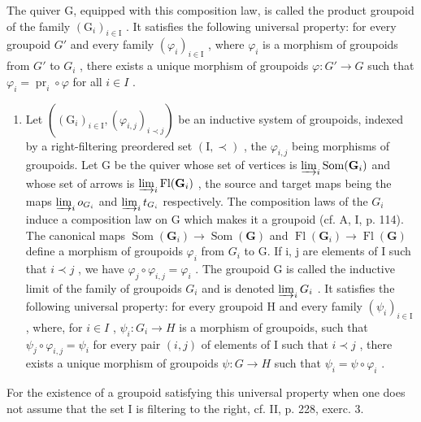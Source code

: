 The quiver G, equipped with this composition law, is called the product groupoid of the family \((\mathrm{G}_{i})_{i\in\mathrm{I}}\) . It satisfies the following universal property: for every groupoid \(G'\) and every family \((\varphi_{i})_{i\in\mathrm{I}}\) , where \(\varphi_{i}\) is a morphism of groupoids from \(G'\) to \(G_{i}\) , there exists a unique morphism of groupoids \(\varphi: G'\to G\) such that \(\varphi_{i}=\operatorname{pr}_{i}\circ\varphi\) for all \(i\in I\) .

\begin{enumerate}
\def\labelenumi{\arabic{enumi})}
\setcounter{enumi}{4}
\tightlist
\item
  Let \(((\mathrm{G}_{i})_{i\in\mathrm{I}},(\varphi_{i,j})_{i\prec j})\) be an inductive system of groupoids, indexed by a right-filtering preordered set \((\mathrm{I},\prec)\) , the \(\varphi_{i,j}\) being morphisms of groupoids. Let G be the quiver whose set of vertices is \(\varinjlim_{i}\operatorname{Som}(\mathbf{G}_{i})\) and whose set of arrows is \(\varinjlim_{i}\operatorname{Fl}(\mathbf{G}_{i})\) , the source and target maps being the maps \(\varinjlim_{i}o_{G_{i}}\) and \(\varinjlim_{i}t_{G_{i}}\) respectively. The composition laws of the \(G_{i}\) induce a composition law on G which makes it a groupoid (cf. A, I, p. 114). The canonical maps \(\operatorname{Som}(\mathbf{G}_{i})\to\operatorname{Som}(\mathbf{G})\) and \(\operatorname{Fl}(\mathbf{G}_{i})\to\operatorname{Fl}(\mathbf{G})\) define a morphism of groupoids \(\varphi_{i}\) from \(G_{i}\) to G. If i, j are elements of I such that \(i\prec j\) , we have \(\varphi_{j}\circ\varphi_{i,j}=\varphi_{i}\) . The groupoid G is called the inductive limit of the family of groupoids \(G_{i}\) and is denoted \(\varinjlim_{i}G_{i}\) . It satisfies the following universal property: for every groupoid H and every family \((\psi_{i})_{i\in\mathrm{I}}\) , where, for \(i\in I\) , \(\psi_{i}:G_{i}\to H\) is a morphism of groupoids, such that \(\psi_{j}\circ\varphi_{i,j}=\psi_{i}\) for every pair \((i,j)\) of elements of I such that \(i\prec j\) , there exists a unique morphism of groupoids \(\psi:G\to H\) such that \(\psi_{i}=\psi\circ\varphi_{i}\) .
\end{enumerate}

For the existence of a groupoid satisfying this universal property when one does not assume that the set I is filtering to the right, cf. II, p. 228, exerc. 3.
\relax{}
